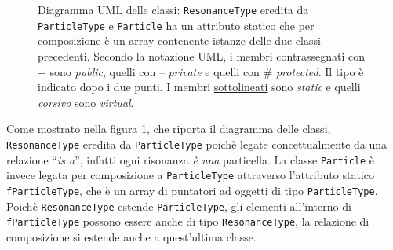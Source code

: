 \documentclass{article}
\begin{document}
\begin{figure}[h!]
\caption{Diagramma UML delle classi: \texttt{ResonanceType} eredita da \texttt{ParticleType} e \texttt{Particle} ha un attributo statico che per composizione è un array contenente istanze delle due classi precedenti. Secondo la notazione UML, i membri contrassegnati con + sono \textit{public}, quelli con -- \textit{private} e quelli con \# \textit{protected}. Il tipo è indicato dopo i due punti. I membri \underline{sottolineati} sono \textit{static} e quelli \textit{corsivo} sono \textit{virtual}.}
\label{fig:uml}
\end{figure}

Come mostrato nella figura \ref{fig:uml}, che riporta il diagramma delle classi, \texttt{ResonanceType} eredita da \texttt{ParticleType} poichè legate concettualmente da una relazione ``\textit{is a}'', infatti ogni risonanza \textit{è una} particella. La classe \texttt{Particle} è invece legata per composizione a \texttt{ParticleType} attraverso l'attributo statico \texttt{fParticleType}, che è un array di puntatori ad oggetti di tipo \texttt{ParticleType}. Poichè \texttt{ResonanceType} estende \texttt{ParticleType}, gli elementi all'interno di \texttt{fParticleType} possono essere anche di tipo \texttt{ResonanceType}, la relazione di composizione si estende anche a quest'ultima classe.
\end{document}
